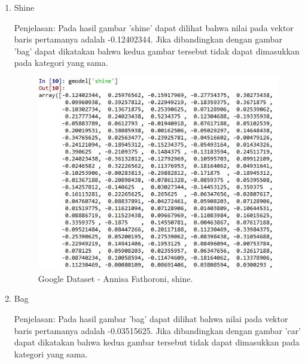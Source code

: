 \begin{enumerate}
\begin{enumerate}
\item Shine

Penjelasan: Pada hasil gambar 'shine' dapat dilihat bahwa nilai pada vektor baris pertamanya adalah -0.12402344. Jika dibandingkan dengan gambar 'bag' dapat dikatakan bahwa kedua gambar tersebut tidak dapat dimasukkan pada kategori yang sama.

\begin{figure}[!hbtp]
\centering
\includegraphics[scale=0.7]{figures/Chapter5AnnisaFathoroni17shine.jpg}
\caption{Google Dataset - Annisa Fathoroni, shine.}
\label{Google Dataset - Annisa Fathoroni, shine.}
\end{figure}

\item Bag

Penjelasan: Pada hasil gambar 'bag' dapat dilihat bahwa nilai pada vektor baris pertamanya adalah -0.03515625. Jika dibandingkan dengan gambar 'car' dapat dikatakan bahwa kedua gambar tersebut tidak dapat dimasukkan pada kategori yang sama.


\end{enumerate}
\end{enumerate}
